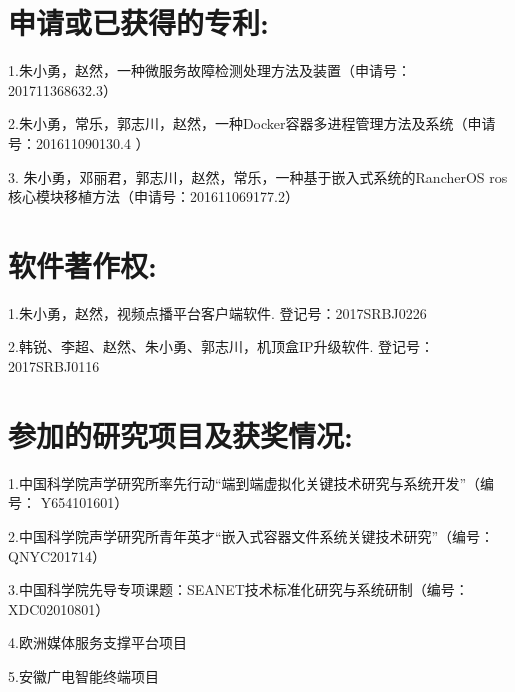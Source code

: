 \section*{申请或已获得的专利:}

1.朱小勇，赵然，一种微服务故障检测处理方法及装置（申请号： 201711368632.3）

2.朱小勇，常乐，郭志川，赵然，一种Docker容器多进程管理方法及系统（申请号：201611090130.4 ）

3. 朱小勇，邓丽君，郭志川，赵然，常乐，一种基于嵌入式系统的RancherOS ros核心模块移植方法（申请号：201611069177.2）

\section*{软件著作权:}

1.朱小勇，赵然，视频点播平台客户端软件. 登记号：2017SRBJ0226

2.韩锐、李超、赵然、朱小勇、郭志川，机顶盒IP升级软件. 登记号：2017SRBJ0116

\section*{参加的研究项目及获奖情况:}

1.中国科学院声学研究所率先行动“端到端虚拟化关键技术研究与系统开发”（编号： Y654101601）

2.中国科学院声学研究所青年英才“嵌入式容器文件系统关键技术研究”（编号：QNYC201714）

3.中国科学院先导专项课题：SEANET技术标准化研究与系统研制（编号：XDC02010801） 

4.欧洲媒体服务支撑平台项目

5.安徽广电智能终端项目


\cleardoublepage[plain]%

